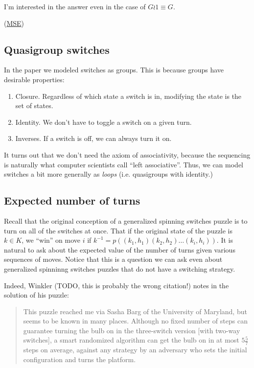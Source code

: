 I'm interested in the answer even in the case of $G \wr \mathrm{1} \equiv G$.

(\href{https://math.stackexchange.com/q/3706654/121988}{MSE})

\subsection{Quasigroup switches}
\label{sub:quasigroupSwitches}
In the paper we modeled switches as groups.
This is because groups have desirable properties: \begin{enumerate}
  \item Closure. Regardless of which state a switch is in, modifying the state is the set of states.
  \item Identity. We don't have to toggle a switch on a given turn.
  \item Inverses. If a switch is off, we can always turn it on.
\end{enumerate}

It turns out that we don't need the axiom of associativity,
because the sequencing is naturally what computer scientists call
``left associative''. Thus, we can model switches a bit more generally as
\textit{loops} (i.e. quasigroups with identity.)

\subsection{Expected number of turns}
Recall that the original conception of a generalized spinning switches puzzle
is to turn on all of the switches at once. That if the original state of
the puzzle is $k \in K$,
we ``win'' on move $i$ if $k^{-1} = p((k_1, h_1)(k_2, h_2)\dots(k_i, h_i))$.
It is natural to ask about the expected value of the number of turns given
various sequences of moves. Notice that this is a question we can ask
even about generalized spinninng switches puzzles that do not have a switching
strategy.

Indeed, Winkler \cite{Winkler2004} (TODO, this is probably the wrong citation!)
notes in the solution of his puzzle:
\begin{quote}
  This puzzle reached me via Sasha Barg of the University of Maryland,
  but seems to be known in many places. Although no fixed number of steps
  can guarantee turning the bulb on in the three-switch version [with two-way switches],
  a smart randomized algorithm can get the bulb on in at most $5 \frac{5}{7}$
  steps on average, against any strategy by an adversary who sets the initial
  configuration and turns the platform. \cite{Winkler2021}
\end{quote}

